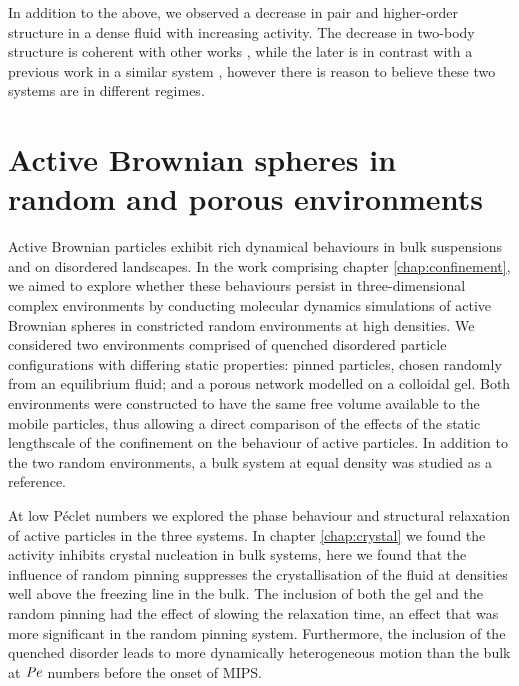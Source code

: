 In addition to the above, we observed a decrease in pair and higher-order structure in a dense fluid with increasing activity. The decrease in two-body structure is coherent with other works \cite{janssen2019,szamel2015,berthier2017}, while the later is in contrast with a previous work in a similar system \cite{dougan2016}, however there is reason to believe these two systems are in different regimes. 



\section{Active Brownian spheres in random and porous environments}

Active Brownian particles exhibit rich dynamical behaviours in bulk suspensions and on disordered landscapes. In the work comprising chapter \ref{chap:confinement}, we aimed to explore whether these behaviours persist in three-dimensional complex environments by conducting molecular dynamics simulations of active Brownian spheres in constricted random environments at high densities. We considered two environments comprised of quenched disordered particle configurations with differing static properties: pinned particles, chosen randomly from an equilibrium fluid; and a porous network modelled on a colloidal gel. Both environments were constructed to have the same free volume available to the mobile particles, thus allowing a direct comparison of the effects of the static lengthscale of the confinement on the behaviour of active particles. In addition to the two random environments, a bulk system at equal density was studied as a reference.

At low Péclet numbers we explored the phase behaviour and structural relaxation of active particles in the three systems. In chapter \ref{chap:crystal} we found the activity inhibits crystal nucleation in bulk systems, here we found that the influence of random pinning suppresses the crystallisation of the fluid at densities well above the freezing line in the bulk. The inclusion of both the gel and the random pinning had the effect of slowing the relaxation time, an effect that was more significant in the random pinning system. Furthermore, the inclusion of the quenched disorder leads to more dynamically heterogeneous motion than the bulk at $\operatorname{\mathit{P\kern-.08em e}}$ numbers before the onset of MIPS.

